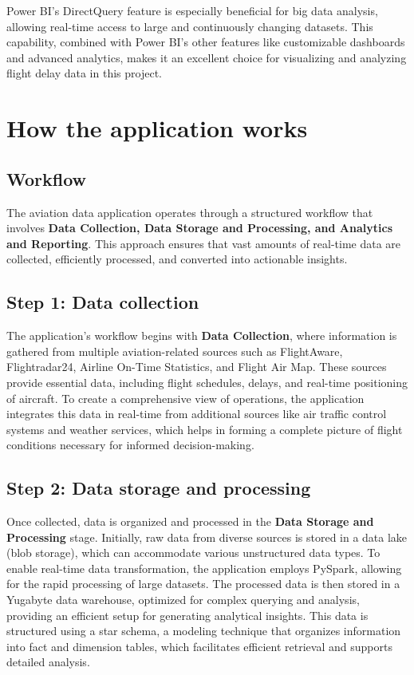 \documentclass[12pt,a4paper]{article}
\begin{document}
Power BI’s DirectQuery feature is especially beneficial for big data analysis,
allowing real-time access to large and continuously changing datasets. This
capability, combined with Power BI’s other features like customizable dashboards
and advanced analytics, makes it an excellent choice for visualizing and
analyzing flight delay data in this project.
\section{How the application works}
\subsection{Workflow}
The aviation data application operates through a structured workflow that
involves \textbf{Data Collection, Data Storage and Processing, and Analytics and
Reporting}. This approach ensures that vast amounts of real-time data are
collected, efficiently processed, and converted into actionable insights.

\subsection*{Step 1: Data collection}
The application’s workflow begins with \textbf{Data Collection}, where
information is gathered from multiple aviation-related sources such as
FlightAware, Flightradar24, Airline On-Time Statistics, and Flight Air Map.
These sources provide essential data, including flight schedules, delays, and
real-time positioning of aircraft. To create a comprehensive view of operations,
the application integrates this data in real-time from additional sources like
air traffic control systems and weather services, which helps in forming a
complete picture of flight conditions necessary for informed decision-making.

\subsection*{Step 2: Data storage and processing}
Once collected, data is organized and processed in the \textbf{Data Storage and
Processing} stage. Initially, raw data from diverse sources is stored in a data
lake (blob storage), which can accommodate various unstructured data types. To
enable real-time data transformation, the application employs PySpark, allowing
for the rapid processing of large datasets. The processed data is then stored in
a Yugabyte data warehouse, optimized for complex querying and analysis,
providing an efficient setup for generating analytical insights. This data is
structured using a star schema, a modeling technique that organizes information
into fact and dimension tables, which facilitates efficient retrieval and
supports detailed analysis.
\end{document}
